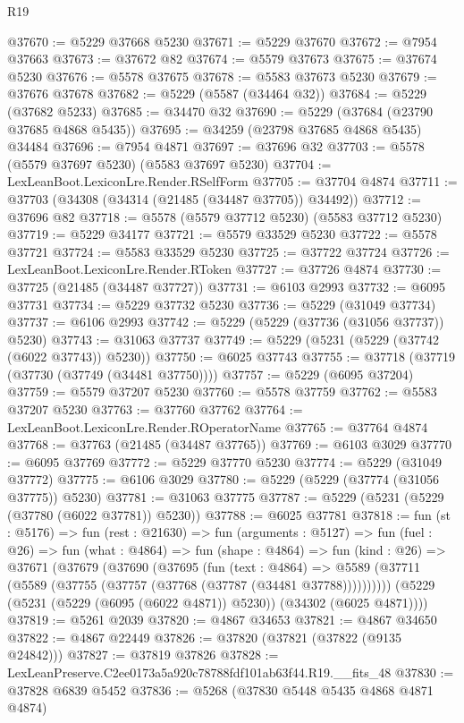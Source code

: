 \begin{lexlean}{R19}
\begin{coremodule}
@37670 := @5229 @37668 @5230
@37671 := @5229 @37670
@37672 := @7954 @37663
@37673 := @37672 @82
@37674 := @5579 @37673
@37675 := @37674 @5230
@37676 := @5578 @37675
@37678 := @5583 @37673 @5230
@37679 := @37676 @37678
@37682 := @5229 (@5587 (@34464 @32))
@37684 := @5229 (@37682 @5233)
@37685 := @34470 @32
@37690 := @5229 (@37684 (@23790 @37685 @4868 @5435))
@37695 := @34259 (@23798 @37685 @4868 @5435) @34484
@37696 := @7954 @4871
@37697 := @37696 @32
@37703 := @5578 (@5579 @37697 @5230) (@5583 @37697 @5230)
@37704 := LexLeanBoot.LexiconLre.Render.RSelfForm
@37705 := @37704 @4874
@37711 := @37703 (@34308 (@34314 (@21485 (@34487 @37705)) @34492))
@37712 := @37696 @82
@37718 := @5578 (@5579 @37712 @5230) (@5583 @37712 @5230)
@37719 := @5229 @34177
@37721 := @5579 @33529 @5230
@37722 := @5578 @37721
@37724 := @5583 @33529 @5230
@37725 := @37722 @37724
@37726 := LexLeanBoot.LexiconLre.Render.RToken
@37727 := @37726 @4874
@37730 := @37725 (@21485 (@34487 @37727))
@37731 := @6103 @2993
@37732 := @6095 @37731
@37734 := @5229 @37732 @5230
@37736 := @5229 (@31049 @37734)
@37737 := @6106 @2993
@37742 := @5229 (@5229 (@37736 (@31056 @37737)) @5230)
@37743 := @31063 @37737
@37749 := @5229 (@5231 (@5229 (@37742 (@6022 @37743)) @5230))
@37750 := @6025 @37743
@37755 := @37718 (@37719 (@37730 (@37749 (@34481 @37750))))
@37757 := @5229 (@6095 @37204)
@37759 := @5579 @37207 @5230
@37760 := @5578 @37759
@37762 := @5583 @37207 @5230
@37763 := @37760 @37762
@37764 := LexLeanBoot.LexiconLre.Render.ROperatorName
@37765 := @37764 @4874
@37768 := @37763 (@21485 (@34487 @37765))
@37769 := @6103 @3029
@37770 := @6095 @37769
@37772 := @5229 @37770 @5230
@37774 := @5229 (@31049 @37772)
@37775 := @6106 @3029
@37780 := @5229 (@5229 (@37774 (@31056 @37775)) @5230)
@37781 := @31063 @37775
@37787 := @5229 (@5231 (@5229 (@37780 (@6022 @37781)) @5230))
@37788 := @6025 @37781
@37818 := fun (st : @5176) =>
  fun (rest : @21630) =>
  fun (arguments : @5127) =>
  fun (fuel : @26) =>
  fun (what : @4864) =>
  fun (shape : @4864) =>
  fun (kind : @26) =>
  @37671
    (@37679
      (@37690
        (@37695
          (fun (text : @4864) =>
          @5589 (@37711 (@5589 (@37755 (@37757 (@37768 (@37787 (@34481 @37788))))))))))
      (@5229 (@5231 (@5229 (@6095 (@6022 @4871)) @5230)) (@34302 (@6025 @4871))))
@37819 := @5261 @2039
@37820 := @4867 @34653
@37821 := @4867 @34650
@37822 := @4867 @22449
@37826 := @37820 (@37821 (@37822 (@9135 @24842)))
@37827 := @37819 @37826
@37828 := LexLeanPreserve.C2ee0173a5a920c78788fdf101ab63f44.R19.__fits_48
@37830 := @37828 @6839 @5452
@37836 := @5268 (@37830 @5448 @5435 @4868 @4871 @4874)

\end{coremodule}
\end{lexlean}
